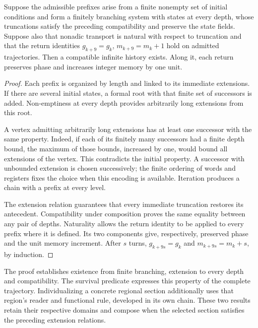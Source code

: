\begin{theorem}
Suppose the admissible prefixes arise from a finite nonempty set of initial conditions and form a finitely branching system with states at every depth, whose truncations satisfy the preceding compatibility and preserve the state fields. Suppose also that nonadic transport is natural with respect to truncation and that the return identities $g_{k+9}=g_k$, $m_{k+9}=m_k+1$ hold on admitted trajectories. Then a compatible infinite history exists. Along it, each return preserves phase and increases integer memory by one unit.
\end{theorem}
\begin{proof}
Each prefix is organized by length and linked to its immediate extensions. If there are several initial states, a formal root with that finite set of successors is added. Non-emptiness at every depth provides arbitrarily long extensions from this root.

A vertex admitting arbitrarily long extensions has at least one successor with the same property. Indeed, if each of its finitely many successors had a finite depth bound, the maximum of those bounds, increased by one, would bound all extensions of the vertex. This contradicts the initial property. A successor with unbounded extension is chosen successively; the finite ordering of words and registers fixes the choice when this encoding is available. Iteration produces a chain with a prefix at every level.

The extension relation guarantees that every immediate truncation restores its antecedent. Compatibility under composition proves the same equality between any pair of depths. Naturality allows the return identity to be applied to every prefix where it is defined. Its two components give, respectively, preserved phase and the unit memory increment. After $s$ turns, $g_{k+9s}=g_k$ and $m_{k+9s}=m_k+s$, by induction.
\end{proof}

The proof establishes existence from finite branching, extension to every depth and compatibility. The survival predicate expresses this property of the complete trajectory. Individualizing a concrete regional section additionally uses that region's reader and functional rule, developed in its own chain. These two results retain their respective domains and compose when the selected section satisfies the preceding extension relations.
